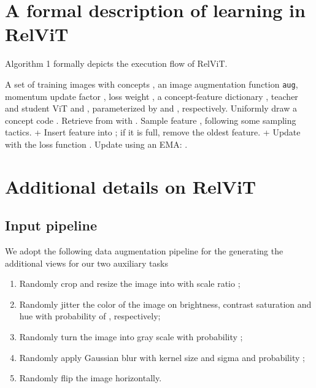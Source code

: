 \documentclass{article} \usepackage{iclr2022_conference,times}
\newcommand{\relvit}{RelViT }
\begin{document}
\newpage
\appendix


\section{A formal description of learning in RelViT}

Algorithm 1 formally depicts the execution flow of RelViT.


\begin{algorithm}[H]
\small
\caption*{\small \textbf{Algorithm 1} RelViT: Concept-guided Vision Transformer 
\label{alg:main}}
\begin{algorithmic}[1]
\REQUIRE A set of training images with concepts , an image augmentation function \texttt{aug}, momentum update factor , loss weight , a concept-feature dictionary , teacher and student ViT  and , parameterized by  and , respectively.
  \STATE     
  \STATE Uniformly draw a concept code . 
  \STATE Retrieve  from  with .
    \STATE Sample feature , following some sampling tactics.
    \STATE  + 
    \STATE Insert feature  into ; if it is full, remove the oldest feature.
    \ELSE
    \STATE  + 
  \ENDIF
  \STATE Update  with the loss function .
  \STATE Update  using an EMA: .
\ENDFOR \\
\end{algorithmic}
\end{algorithm}


\section{Additional details on \relvit}

\subsection{Input pipeline}

We adopt the following data augmentation pipeline for the generating the additional views for our two auxiliary tasks
\begin{enumerate}
    \item Randomly crop and resize the image into  with scale ratio ;
    \item Randomly jitter the color of the image on brightness, contrast saturation and hue with probability of , respectively;
    \item Randomly turn the image into gray scale with probability ;
    \item Randomly apply Gaussian blur with kernel size  and sigma  and probability ;
    \item Randomly flip the image horizontally.
\end{enumerate}
\end{document}
